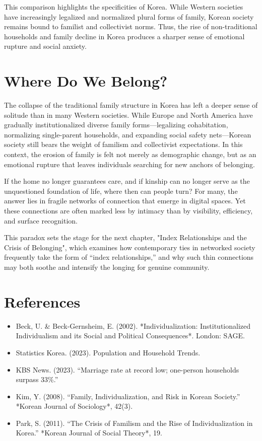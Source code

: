 This comparison highlights the specificities of Korea. While Western societies have increasingly legalized and normalized plural forms of family, Korean society remains bound to familist and collectivist norms. Thus, the rise of non-traditional households and family decline in Korea produces a sharper sense of emotional rupture and social anxiety.  

\section{Where Do We Belong?}

The collapse of the traditional family structure in Korea has left a deeper sense of solitude than in many Western societies. While Europe and North America have gradually institutionalized diverse family forms—legalizing cohabitation, normalizing single-parent households, and expanding social safety nets—Korean society still bears the weight of familism and collectivist expectations. In this context, the erosion of family is felt not merely as demographic change, but as an emotional rupture that leaves individuals searching for new anchors of belonging.  

If the home no longer guarantees care, and if kinship can no longer serve as the unquestioned foundation of life, where then can people turn? For many, the answer lies in fragile networks of connection that emerge in digital spaces. Yet these connections are often marked less by intimacy than by visibility, efficiency, and surface recognition.  

This paradox sets the stage for the next chapter, "Index Relationships and the Crisis of Belonging", which examines how contemporary ties in networked society frequently take the form of “index relationships,” and why such thin connections may both soothe and intensify the longing for genuine community.


\section{References}
\begin{itemize}
  \item Beck, U. \& Beck-Gernsheim, E. (2002). *Individualization: Institutionalized Individualism and its Social and Political Consequences*. London: SAGE.  
  \item Statistics Korea. (2023). Population and Household Trends.  
  \item KBS News. (2023). “Marriage rate at record low; one-person households surpass 33\%.”  
  \item Kim, Y. (2008). “Family, Individualization, and Risk in Korean Society.” *Korean Journal of Sociology*, 42(3).  
  \item Park, S. (2011). “The Crisis of Familism and the Rise of Individualization in Korea.” *Korean Journal of Social Theory*, 19.  
\end{itemize}



